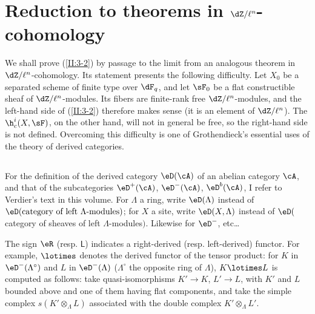 \documentclass[oneside]{book}
\begin{document}
\section{Reduction to theorems in \texorpdfstring{$\dZ/\ell^n$}{Z/l n}-cohomology}\label{II:4}

We shall prove (\ref{II:3-2}) by passage to the limit from an analogous
theorem in $\dZ/\ell^n$-cohomology. Its statement presents the following
difficulty. Let $X_0$ be a separated scheme of finite type over $\dF_q$, and
let $\sF_0$ be a flat constructible sheaf of $\dZ/\ell^n$-modules. Its fibers
are finite-rank free $\dZ/\ell^n$-modules, and the left-hand side of
(\ref{II:3-2}) therefore makes sense (it is an element of $\dZ/\ell^n$).
The $\h_c^i(X,\sF)$, on the other hand, will not in general be free, so the
right-hand side is not defined. Overcoming this difficulty is one of
Grothendieck's essential uses of the theory of derived categories.






\subsection{}\label{II:4-1}

For the definition of the derived category $\eD(\cA)$ of an abelian category
$\cA$, and that of the subcategories $\eD^+(\cA)$, $\eD^-(\cA)$,
$\eD^b(\cA)$, I refer to Verdier's text in this volume. For $\Lambda$ a ring,
write $\eD(\Lambda)$ instead of
$\eD(\text{category of left $\Lambda$-modules})$; for $X$ a site, write
$\eD(X,\Lambda)$ instead of
$\eD($category of sheaves of left $\Lambda$-modules$)$. Likewise for
$\eD^-$, etc\ldots

The sign $\eR$ (resp. $\mathsf{L}$) indicates a right-derived (resp.
left-derived) functor. For example, $\lotimes$ denotes the derived functor of
the tensor product: for $K$ in $\eD^-(\Lambda^\circ)$ and $L$ in
$\eD^-(\Lambda)$ ($\Lambda^\circ$ the opposite ring of $\Lambda$),
$K\lotimes L$ is computed as follows: take quasi-isomorphisms $K'\to K$,
$L'\to L$, with $K'$ and $L$ bounded above and one of them having flat
components, and take the simple complex $s(K'\otimes_\Lambda L)$ associated
with the double complex $K'\otimes_\Lambda L'$.






\subsection{}\label{II:4-2}
\end{document}
